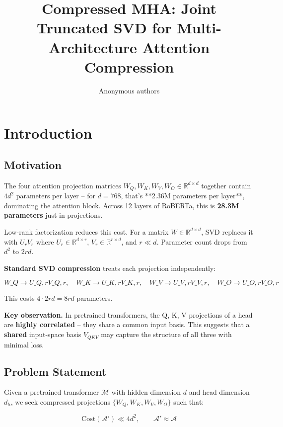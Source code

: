 \title{\textbf{Compressed MHA: Joint Truncated SVD for Multi-Architecture Attention Compression}}

\author{Anonymous authors}


\section{Introduction}

\subsection{Motivation}

The four attention projection matrices $W_Q, W_K, W_V, W_O \in \mathbb{R}^{d \times d}$ 
together contain $4 d^2$ parameters per layer -- for $d = 768$, that's **2.36M 
parameters per layer**, dominating the attention block. Across 12 layers of 
RoBERTa, this is \textbf{28.3M parameters} just in projections.

Low-rank factorization reduces this cost. For a matrix $W \in \mathbb{R}^{d \times d}$, 
SVD replaces it with $U_r V_r$ where $U_r \in \mathbb{R}^{d \times r}$, 
$V_r \in \mathbb{R}^{r \times d}$, and $r \ll d$. Parameter count drops from 
$d^2$ to $2 r d$.

\textbf{Standard SVD compression} treats each projection independently:

\[
W\_Q \to U\_{Q,r} V\_{Q,r}, \quad W\_K \to U\_{K,r} V\_{K,r}, \quad W\_V \to U\_{V,r} V\_{V,r}, \quad W\_O \to U\_{O,r} V\_{O,r}
\]

This costs $4 \cdot 2 r d = 8 r d$ parameters.

\textbf{Key observation.} In pretrained transformers, the Q, K, V projections of a 
head are \textbf{highly correlated} -- they share a common input basis. This suggests 
that a \textbf{shared} input-space basis $V_{QKV}$ may capture the structure of all 
three with minimal loss.

\subsection{Problem Statement}

Given a pretrained transformer $\mathcal{M}$ with hidden dimension $d$ and 
head dimension $d_h$, we seek compressed projections 
$\{W_Q, W_K, W_V, W_O\}$ such that:

\[
\text{Cost}(\mathcal{A}') \ll 4 d^2, \qquad
\mathcal{A}' \approx \mathcal{A}
\]

